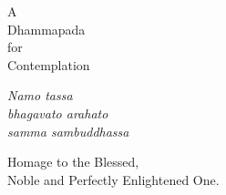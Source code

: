 
\cleartorecto

A\\
Dhammapada\\
for\\
Contemplation

\emph{Namo tassa}\\
\emph{bhagavato arahato}\\
\emph{samma sambuddhassa}

Homage to the Blessed,\\
Noble and Perfectly Enlightened One.


